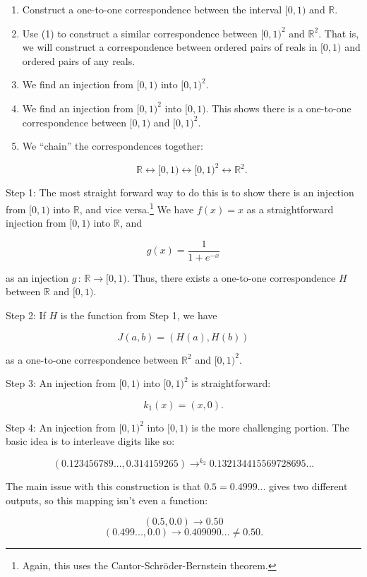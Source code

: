 \documentclass[../key.tex]{subfiles}
\begin{document}
\begin{enumerate}
\item Construct a one-to-one correspondence between the interval $[0,1)$ and $\mathbb{R}$.
\item Use (1) to construct a similar correspondence between $[0,1)^2$ and $\mathbb{R}^2$. That is, we will construct a correspondence between ordered pairs of reals in $[0,1)$ and ordered pairs of any reals.
\item We find an injection from $[0,1)$ into $[0,1)^2$.
\item We find an injection from $[0,1)^2$ into $[0,1)$. This shows there is a one-to-one correspondence between $[0,1)$ and $[0,1)^2$.
\item We ``chain'' the correspondences together:

$$\mathbb{R} \leftrightarrow [0,1) \leftrightarrow [0,1)^2 \leftrightarrow \mathbb{R}^2.$$
\end{enumerate}

\noindent Step 1: The most straight forward way to do this is to show there is an injection from $[0,1)$ into $\mathbb{R}$, and vice versa.\footnote{Again, this uses the Cantor-Schröder-Bernstein theorem.} We have $f(x)=x$ as a straightforward injection from $[0,1)$ into $\mathbb{R}$, and

$$g(x)=\frac{1}{1+e^{-x}}$$

\noindent as an injection $g\, : \, \mathbb{R} \to [0,1)$. Thus, there exists a one-to-one correspondence $H$ between $\mathbb{R}$ and $[0,1)$.

Step 2: If $H$ is the function from Step 1, we have

$$J(a,b)=(H(a),H(b))$$

\noindent as a one-to-one correspondence between $\mathbb{R}^2$ and $[0,1)^2$.

\noindent Step 3: An injection from $[0,1)$ into $[0,1)^2$ is straightforward:

$$k_1(x)=(x, 0).$$

\noindent Step 4: An injection from $[0,1)^2$ into $[0,1)$ is the more challenging portion. The basic idea is to interleave digits like so:

$$(0.123456789..., 0.314159265)\mathop{\to} ^ {k_2} 0.132134415569728695...$$

\noindent The main issue with this construction is that $0.5=0.4999...$ gives two different outputs, so this mapping isn't even a function:

$$(0.5,0.0)\to 0.50$$
$$(0.499...,0.0)\to 0.409090... \neq 0.50.$$
\end{document}
